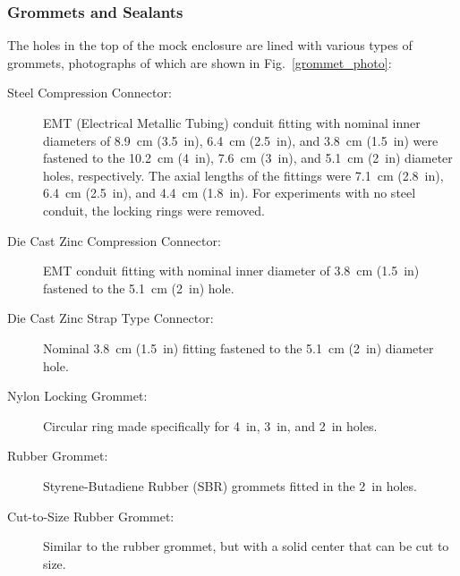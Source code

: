 \FloatBarrier

\subsubsection{Grommets and Sealants}

The holes in the top of the mock enclosure are lined with various types of grommets, photographs of which are shown in Fig.~\ref{grommet_photo}:
\begin{description}
\item[Steel Compression Connector:] EMT (Electrical Metallic Tubing) conduit fitting with nominal inner diameters of 8.9~cm (3.5~in), 6.4~cm (2.5~in), and 3.8~cm (1.5~in) were fastened to the 10.2~cm (4~in), 7.6~cm (3~in), and 5.1~cm (2~in) diameter holes, respectively. The axial lengths of the fittings were 7.1~cm (2.8~in), 6.4~cm (2.5~in), and 4.4~cm (1.8~in). For experiments with no steel conduit, the locking rings were removed.
\item[Die Cast Zinc Compression Connector:] EMT conduit fitting with nominal inner diameter of 3.8~cm (1.5~in) fastened to the 5.1~cm (2~in) hole.
\item[Die Cast Zinc Strap Type Connector:] Nominal 3.8~cm (1.5~in) fitting fastened to the 5.1~cm (2~in) diameter hole.
\item[Nylon Locking Grommet:] Circular ring made specifically for 4~in, 3~in, and 2~in holes.
\item[Rubber Grommet:] Styrene-Butadiene Rubber (SBR) grommets fitted in the 2~in holes.
\item[Cut-to-Size Rubber Grommet:] Similar to the rubber grommet, but with a solid center that can be cut to size.
\end{description}

